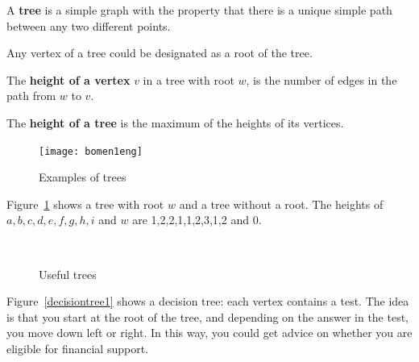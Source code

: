  \begin{definition}[Tree]
  \textup{ A \textbf{tree} is a simple graph with the property that
there is a unique simple path between any two different points. }
\end{definition}

Any vertex of a tree could be designated as a root of the tree.

 \begin{definition}
  \textup{
The
 \textbf{height of a vertex} $v$ in a tree with root
    $w$, is the number of edges in the path from $w$ to $v$. }
\end{definition}

 \begin{definition}
  \textup{
The
\textbf{height of a tree} is the maximum of the heights of its vertices.}
\end{definition}

\begin{figure}[ht]
\begin{center}
\texttt{[image: bomen1eng]}
\end{center}
\caption{Examples of trees \label{bomen1}}
\end{figure}


Figure~\ref{bomen1} shows a tree with root $w$ and a tree without a
root. The heights of $a,b,c,d,e,f,g,h,i$ and $w$ are 1,2,2,1,1,2,3,1,2
and 0.

\begin{figure}[ht]
\centering
\mbox{
{}}
\caption{Useful trees}
\end{figure}


Figure~\ref{decisiontree1} shows a decision tree: each vertex
contains a test. The idea is that you start at the root of the tree,
and depending on the answer in the test, you move down left or
right. In this way, you could get advice on whether you are eligible
for financial support.


